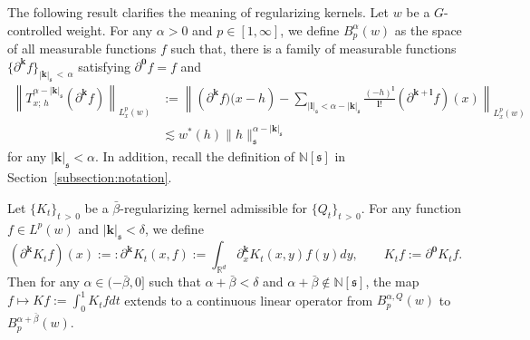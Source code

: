\documentclass[AHL,Unicode,longabstracts,published]{cedram}
\newcommand{\bbR}{\mathbb{R}}
\newcommand{\bbN}{\mathbb{N}}
\newcommand{\mfs}{\mathfrak{s}}
\newcommand{\bfzo}{\mathbf{0}}
\newcommand{\bfk}{\mathbf{k}}
\newcommand{\bfl}{\mathbf{l}}
\begin{document}
The following result clarifies the meaning of regularizing kernels. Let $w$ be a $G$-controlled weight. For any $\alpha>0$ and $p\in[1,\infty]$, we define $B_p^{\alpha}(w)$ as the space of all measurable functions $f$ such that, there is a family of measurable functions $\{\partial^{\bfk}f\}_{|{\bfk}|_\mfs\,<\,\alpha}$ satisfying $\partial^{\bfzo}f=f$ and
\begin{align*}
\left\|T_{x;\,h}^{\alpha-|{\bfk}|_\mfs}\left(\partial^{\bfk}f\right)\right\|_{L_x^p(w)} &:=\left\|\left(\partial^{\bfk}f)(x-h\right)-\sum_{|{\bfl}|_\mfs<\alpha-|{\bfk}|_\mfs}\frac{(-h)^{\bfl}}{{\bfl}!}\left(\partial^{{\bfk}+{\bfl}}f\right)(x)\right\|_{L_x^p(w)}\\
&\lesssim w^*(h)\|h\|_\mfs^{\alpha-|{\bfk}|_\mfs}
\end{align*}
for any $|{\bfk}|_\mfs<\alpha$. In addition, recall the definition of $\bbN[\mfs]$ in Section~\ref{subsection:notation}.

\begin{lemm}\label{lem:whyregularize}
Let $\{K_t\}_{t\,>\,0}$ be a $\bar\beta$-regularizing kernel admissible for $\{Q_t\}_{t\,>\,0}$. For any function $f\in L^p(w)$ and $|{\bfk}|_{\mfs}<\delta$, we define
\[
\left(\partial^{\bfk}K_tf\right)(x):=:\partial^{\bfk}K_t(x,f):=\int_{\bbR^d}\partial_x^{\bfk}K_t(x,y)f(y)dy,\qquad K_tf:=\partial^{\bfzo}K_tf.
\]
Then for any $\alpha\in(-\bar\beta,0]$ such that $\alpha+\bar\beta<\delta$ and $\alpha+\bar\beta\notin\bbN[\mfs]$, the map $f\mapsto Kf:=\int_0^1K_tfdt$ extends to a continuous linear operator from $B_p^{\alpha,Q}(w)$ to $B_p^{\alpha+\bar\beta}(w)$.
\end{lemm}
\end{document}
